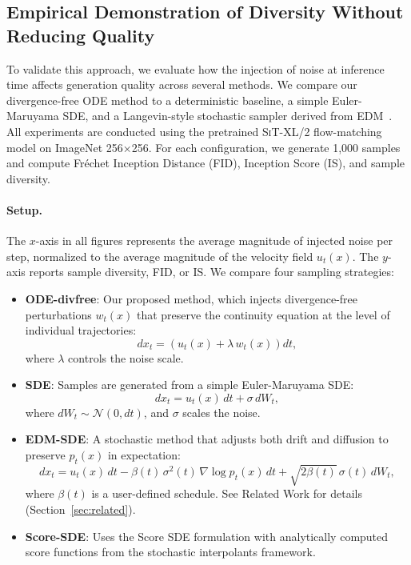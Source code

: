 \documentclass{article}
\begin{document}
\subsection{Empirical Demonstration of Diversity Without Reducing Quality}
\label{sec:noise_study}

To validate this approach, we evaluate how the injection of noise at inference time affects generation quality across several methods. We compare our divergence-free ODE method to a deterministic baseline, a simple Euler-Maruyama SDE, and a Langevin-style stochastic sampler derived from EDM~\cite{karras2022elucidatingdesignspacediffusionbased}. All experiments are conducted using the pretrained \textsc{SiT-XL/2} flow-matching model on ImageNet 256×256. For each configuration, we generate 1,000 samples and compute Fréchet Inception Distance (FID), Inception Score (IS), and sample diversity.

\paragraph{Setup.}
The $x$-axis in all figures represents the average magnitude of injected noise per step, normalized to the average magnitude of the velocity field \( u_t(x) \). The $y$-axis reports sample diversity, FID, or IS. We compare four sampling strategies:

\begin{itemize}
  \item \textbf{ODE-divfree}: Our proposed method, which injects divergence-free perturbations \( w_t(x) \) that preserve the continuity equation at the level of individual trajectories:
  \[
  dx_t = \left(u_t(x) + \lambda\,w_t(x)\right) dt,
  \]
  where \( \lambda \) controls the noise scale.
  \item \textbf{SDE}: Samples are generated from a simple Euler-Maruyama SDE:
  \[
  dx_t = u_t(x)\,dt + \sigma\,dW_t,
  \]
  where \( dW_t \sim \mathcal{N}(0, dt) \), and \(\sigma\) scales the noise.
  \item \textbf{EDM-SDE}: A stochastic method that adjusts both drift and diffusion to preserve \(p_t(x)\) in expectation:
  \[
  dx_t = u_t(x)\,dt - \beta(t)\,\sigma^2(t)\,\nabla \log p_t(x)\,dt + \sqrt{2\beta(t)}\,\sigma(t)\,dW_t,
  \]
  where \(\beta(t)\) is a user-defined schedule. See Related Work for details (Section~\ref{sec:related}).
  \item \textbf{Score-SDE}: Uses the Score SDE formulation with analytically computed score functions from the stochastic interpolants framework.
\end{itemize}
\end{document}
